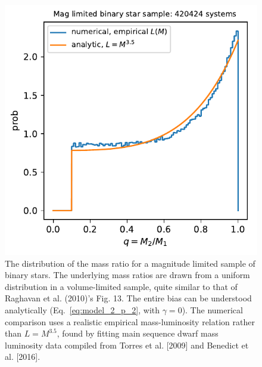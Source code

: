 \begin{figure}[!tb]
    \centering
    \includegraphics[width=\textwidth]{figures/q_distribn_mag_limited.pdf}
    \caption{
    The distribution of the mass ratio for a magnitude limited sample of 
    binary stars. The underlying mass ratios are drawn from a uniform 
    distribution in a volume-limited sample, quite similar to that of Raghavan 
    et al. (2010)'s Fig. 13.
    The entire bias can be understood analytically (Eq.~\ref{eq:model_2_p_2},
    with $\gamma=0$).
    The numerical comparison uses a realistic empirical mass-luminosity 
    relation rather than $L=M^{3.5}$, found by fitting main sequence dwarf 
    mass luminosity data compiled from Torres et al. [2009] and Benedict et 
    al. [2016].
    }
    \label{fig:q_distribn_mag_limited}
\end{figure}


